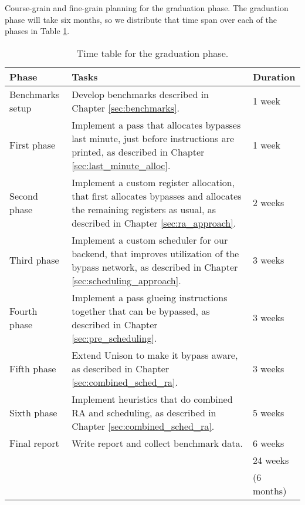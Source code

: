 Course-grain and fine-grain planning for the graduation phase. The graduation phase will take six months, so we distribute that time span over each of the phases in Table \ref{table:planning}.

\begin{table}[h]
\caption{Time table for the graduation phase.}
\begin{center}
\begin{tabular}{@{}p{}p{}p{}@{}}
\toprule
\textbf{Phase} 		& \textbf{Tasks} & \textbf{Duration} \\ \hline
Benchmarks setup 	& Develop benchmarks described in Chapter \ref{sec:benchmarks}.			& 1 week \\
First phase		& Implement a pass that allocates bypasses last minute, just before instructions are printed, as described in Chapter \ref{sec:last_minute_alloc}.		& 1 week \\
Second phase	& Implement a custom register allocation, that first allocates bypasses and allocates the remaining registers as usual, as described in Chapter \ref{sec:ra_approach}.	& 2 weeks \\
Third phase		& Implement a custom scheduler for our backend, that improves utilization of the bypass network, as described in Chapter \ref{sec:scheduling_approach}. & 3 weeks \\
Fourth phase 	& Implement a pass glueing instructions together that can be bypassed, as described in Chapter \ref{sec:pre_scheduling}. & 3 weeks\\
Fifth phase 	& Extend Unison to make it bypass aware, as described in Chapter \ref{sec:combined_sched_ra}. & 3 weeks \\
Sixth phase		& Implement heuristics that do combined RA and scheduling, as described in Chapter \ref{sec:combined_sched_ra}. & 5 weeks \\
Final report		& Write report and collect benchmark data. 	& 6 weeks \\
\hline%
\multicolumn{2}{c}{ \multirow{2}{*}{Total time}} 				& 24 weeks\\
	&											& (6 months)\\
\bottomrule
\end{tabular}
\end{center}
\label{table:planning}
\end{table}%
